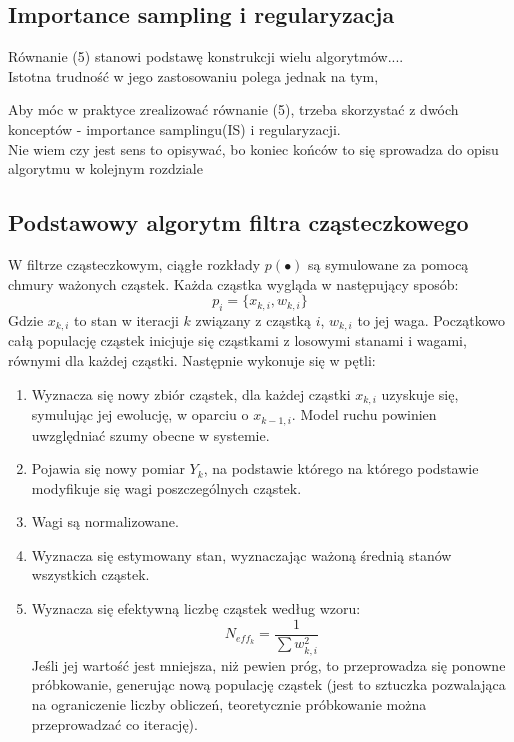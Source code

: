 \documentclass[10pt,a4paper]{article}
\begin{document}
\subsection{Importance sampling i regularyzacja}
Równanie (5) stanowi podstawę konstrukcji wielu algorytmów....\\
Istotna trudność w jego zastosowaniu polega jednak na tym, 

Aby móc w praktyce zrealizować równanie (5), trzeba skorzystać z dwóch konceptów - importance samplingu(IS) i regularyzacji. \\
Nie wiem czy jest sens to opisywać, bo koniec końców to się sprowadza do opisu algorytmu w kolejnym rozdziale
\subsection{Podstawowy algorytm filtra cząsteczkowego}
W filtrze cząsteczkowym, ciągłe rozkłady $p(\bullet)$ są symulowane za pomocą chmury ważonych cząstek. Każda cząstka wygląda w następujący sposób:
\begin{equation*}
	p_i=\{x_{k,i},w_{k,i}\}
\end{equation*}
Gdzie $x_{k,i}$ to stan w iteracji $k$ związany z cząstką $i$, $w_{k,i}$ to jej waga.
Początkowo całą populację cząstek inicjuje się cząstkami z losowymi stanami i wagami, równymi dla każdej cząstki. Następnie wykonuje się w pętli:
\begin{enumerate}[label=(\alph*)]
	\item Wyznacza się nowy zbiór cząstek, dla każdej cząstki $x_{k,i}$ uzyskuje się, symulując jej ewolucję, w oparciu o $x_{k-1,i}$. Model ruchu powinien uwzględniać szumy obecne w systemie.
	\item Pojawia się nowy pomiar $Y_k$, na podstawie którego na którego podstawie modyfikuje się wagi poszczególnych cząstek.
	\item Wagi są normalizowane.
	\item Wyznacza się estymowany stan, wyznaczając ważoną średnią stanów wszystkich cząstek.
	\item Wyznacza się efektywną liczbę cząstek według wzoru:
	\begin{equation*}
		N_{eff_k} = \dfrac{1}{\sum w_{k,i}^2}
	\end{equation*}
	Jeśli jej wartość jest mniejsza, niż pewien próg, to przeprowadza się ponowne próbkowanie, generując nową populację cząstek (jest to sztuczka pozwalająca na ograniczenie liczby obliczeń, teoretycznie próbkowanie można przeprowadzać co iterację).
\end{enumerate}
\end{document}
